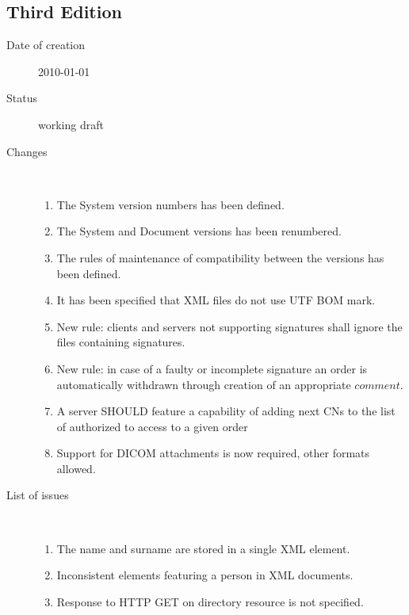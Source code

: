 \documentclass[a4paper]{article}
\begin{document}
\subsection{Third Edition}
\begin{description}
  \item[Date of creation] 2010-01-01
  \item[Status] working draft
  \item[Changes] \hfill \\
	\begin{enumerate}
      \item The System version numbers has been defined.
      \item The System and Document versions has been renumbered.
      \item The rules of maintenance of compatibility between the versions has been defined.
	  \item It has been specified that XML files do not use UTF BOM mark.
      \item New rule: clients and servers not supporting signatures shall 
		ignore the files containing signatures.
      \item New rule: in case of a faulty or incomplete signature an order is 
		automatically withdrawn through creation of an appropriate $comment$.
      \item A server SHOULD feature a capability of adding next CNs to the 
		list of authorized to access to a given order
      \item Support for DICOM attachments is now required, other formats allowed.
	\end{enumerate}
  \item[List of issues] \hfill \\
	\begin{enumerate}
      \item The name and surname are stored in a single XML element.
      \item Inconsistent elements featuring a person in XML documents.
	  \item Response to HTTP GET on directory resource is not specified.
	\end{enumerate}
\end{description}
\end{document}
